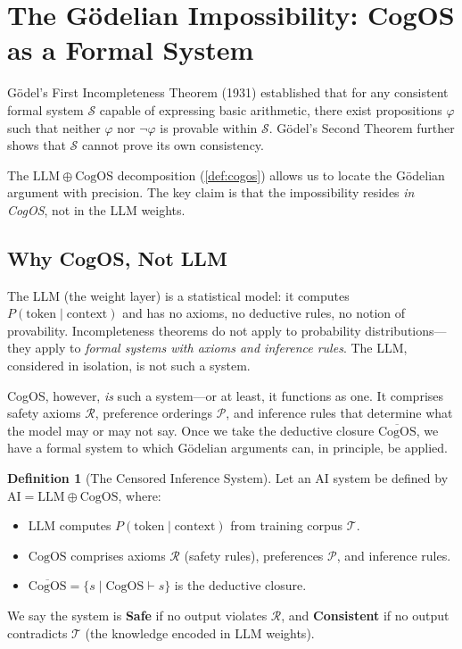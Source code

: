 \documentclass[11pt,a4paper]{article}
\theoremstyle{definition}
\newtheorem{definition}{Definition}[section]
\theoremstyle{plain}
\theoremstyle{remark}
\begin{document}
\section{The G\"{o}delian Impossibility: CogOS as a Formal System}\label{sec:godelian}

G\"{o}del's First Incompleteness Theorem (1931) established that for any consistent formal system $\mathcal{S}$ capable of expressing basic arithmetic, there exist propositions $\varphi$ such that neither $\varphi$ nor $\neg\varphi$ is provable within $\mathcal{S}$. G\"{o}del's Second Theorem further shows that $\mathcal{S}$ cannot prove its own consistency.

The $\mathrm{LLM} \oplus \mathrm{CogOS}$ decomposition (\cref{def:cogos}) allows us to locate the Gödelian argument with precision. The key claim is that the impossibility resides \emph{in CogOS}, not in the LLM weights.

\subsection{Why CogOS, Not LLM}

The LLM (the weight layer) is a statistical model: it computes $P(\mathrm{token} \mid \mathrm{context})$ and has no axioms, no deductive rules, no notion of provability. Incompleteness theorems do not apply to probability distributions---they apply to \emph{formal systems with axioms and inference rules}. The LLM, considered in isolation, is not such a system.

CogOS, however, \emph{is} such a system---or at least, it functions as one. It comprises safety axioms $\mathcal{R}$, preference orderings $\mathcal{P}$, and inference rules that determine what the model may or may not say. Once we take the deductive closure $\overline{\mathrm{CogOS}}$, we have a formal system to which Gödelian arguments can, in principle, be applied.

\begin{definition}[The Censored Inference System]\label{def:censored}
Let an AI system be defined by $\mathrm{AI} = \mathrm{LLM} \oplus \mathrm{CogOS}$, where:
\begin{itemize}[itemsep=3pt]
  \item $\mathrm{LLM}$ computes $P(\mathrm{token} \mid \mathrm{context})$ from training corpus $\mathcal{T}$.
  \item $\mathrm{CogOS}$ comprises axioms $\mathcal{R}$ (safety rules), preferences $\mathcal{P}$, and inference rules.
  \item $\overline{\mathrm{CogOS}} = \{s \mid \mathrm{CogOS} \vdash s\}$ is the deductive closure.
\end{itemize}
We say the system is \textbf{Safe} if no output violates $\mathcal{R}$, and \textbf{Consistent} if no output contradicts $\mathcal{T}$ (the knowledge encoded in LLM weights).
\end{definition}
\end{document}
